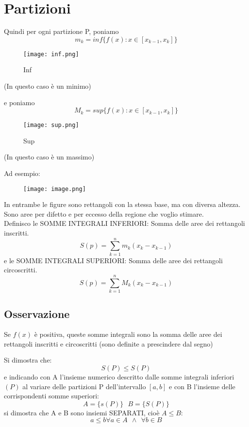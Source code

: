 \documentclass[../main.tex]{subfiles}
\begin{document}
\section{Partizioni}
Quindi per ogni partizione P, poniamo\[m_k = inf\{f(x):x\in [x_{k-1}, x_k]\}\]

\begin{figure}[ht]
    \centering
    \texttt{[image: inf.png]}
    \caption{Inf}
    \label{fig:inf}
\end{figure}

(In questo caso è un minimo)

e poniamo\[M_k = sup\{f(x):x\in[x_{k-1}, x_k]\}\]

\begin{figure}[!ht]
    \centering
    \texttt{[image: sup.png]}
    \caption{Sup}\label{fig:sup}
\end{figure}

(In questo caso è un massimo)

\newpage

Ad esempio:
\begin{figure}[ht]
    \centering
    \texttt{[image: image.png]}\label{fig:supinf}
\end{figure}

\vspace{10pt}
In entrambe le figure sono rettangoli con la stessa base, ma con diversa
altezza. Sono aree per difetto e per eccesso della regione che voglio stimare.\\
Definisco le SOMME INTEGRALI INFERIORI: Somma delle aree dei rettangoli
inscritti.\[S(p) = \sum_{k=1}^{n}m_k(x_k-x_{k-1})\]
e le SOMME INTEGRALI SUPERIORI: Somma delle aree dei rettangoli circoscritti.
\[S(p) = \sum_{k=1}^{n}M_k(x_k-x_{k-1})\]

\subsection{Osservazione}
Se $f(x)$ è positiva, queste somme integrali sono la somma delle aree dei
rettangoli inscritti e circoscritti (sono definite a prescindere dal segno)

Si dimostra che:\[S(P) \leq S(P)\] e indicando con A l'insieme numerico descritto dalle somme integrali inferiori
$(P)$ al variare delle partizioni P dell'intervallo $[a, b]$ e con B l'insieme
delle corrispondenti somme superiori:\[A = \{s(P)\} \ \ \ B=\{S(P)\}\] si dimostra che A e B sono insiemi SEPARATI, cioè $A\leq B$:\[a\leq b \forall a\in A \ \ \land \ \ \forall b \in
    B\]
\end{document}
